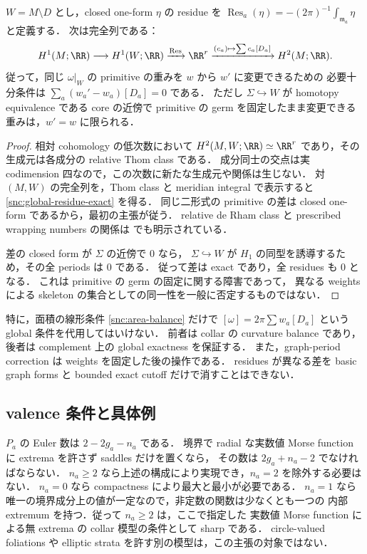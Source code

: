 \begin{proposition}
\label{snc:residue-change}
$W=M\setminus D$ とし，closed one-form $\eta$ の residue を
$\operatorname{Res}_a(\eta)=-(2\pi)^{-1}\int_{\mathfrak m_a}\eta$ と定義する．
次は完全列である：
\begin{equation}\label{snc:global-residue-exact}
 H^1(M;\RR)\longrightarrow H^1(W;\RR)
 \xrightarrow{\operatorname{Res}}\RR^r
 \xrightarrow{(c_a)\mapsto\sum c_a[D_a]} H^2(M;\RR).
\end{equation}
従って，同じ $\omega|_W$ の primitive の重みを $w$ から $w'$ に変更できるための
必要十分条件は $\sum_a(w_a'-w_a)[D_a]=0$ である．
ただし $\Sigma\hookrightarrow W$ が homotopy equivalence である core の近傍で
primitive の germ を固定したまま変更できる重みは，$w'=w$ に限られる．
\end{proposition}
\begin{proof}
相対 cohomology の低次数において
$H^2(M,W;\RR)\simeq\RR^r$ であり，その生成元は各成分の relative Thom class である．
成分同士の交点は実 codimension 四なので，この次数に新たな生成元や関係は生じない．
対 $(M,W)$ の完全列を，Thom class と meridian integral で表示すると
\eqref{snc:global-residue-exact} を得る．
同じ二形式の primitive の差は closed one-form であるから，最初の主張が従う．
relative de Rham class と prescribed wrapping numbers の関係は
\cite[\S1.1, Proposition 2.10]{BSV}でも明示されている．

差の closed form が $\Sigma$ の近傍で $0$ なら，
$\Sigma\hookrightarrow W$ が $H_1$ の同型を誘導するため，その全 periods は $0$ である．
従って差は exact であり，全 residues も $0$ となる．
これは primitive の germ の固定に関する障害であって，
異なる weights による skeleton の集合としての同一性を一般に否定するものではない．
\end{proof}

特に，面積の線形条件 \eqref{snc:area-balance} だけで
$[\omega]=2\pi\sum w_a[D_a]$ という global 条件を代用してはいけない．
前者は collar の curvature balance であり，後者は complement 上の global exactness を保証する．
また，graph-period correction は weights を固定した後の操作である．
residues が異なる差を basic graph forms と bounded exact cutoff だけで消すことはできない．

\subsection{valence 条件と具体例}

$P_a$ の Euler 数は $2-2g_a-n_a$ である．
境界で radial な実数値 Morse function に extrema を許さず saddles だけを置くなら，
その数は $2g_a+n_a-2$ でなければならない．
$n_a\geq2$ なら上述の構成により実現でき，$n_a=2$ を除外する必要はない．
$n_a=0$ なら compactness により最大と最小が必要である．
$n_a=1$ なら唯一の境界成分上の値が一定なので，非定数の関数は少なくとも一つの
内部 extremum を持つ．従って $n_a\geq2$ は，ここで指定した
実数値 Morse function による無 extrema の collar 模型の条件として sharp である．
circle-valued foliations や elliptic strata を許す別の模型は，この主張の対象ではない．

